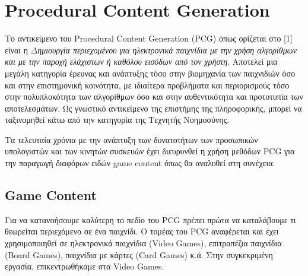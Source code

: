 \thispagestyle{empty}

\chapter{Procedural Content Generation}

Το αντικείμενο του Procedural Content Generation (PCG) όπως ορίζεται στο [1] είναι η \textit{Δημιουργία περιεχομένου για ηλεκτρονικά παιχνίδια με την χρήση αλγορίθμων και με την παροχή ελάχιστων ή καθόλου εισόδων από τον χρήστη}. Αποτελεί μια μεγάλη κατηγορία έρευνας και ανάπτυξης τόσο στην βιομηχανία των  παιχνιδιών όσο και στην επιστημονική κοινότητα, με ιδιαίτερα προβλήματα και περιορισμούς τόσο στην πολυπλοκότητα των αλγορίθμων όσο και στην αυθεντικότητα και προτοτυπία των αποτελεσμάτων.  Ως γνωστικό αντικείμενο της επιστήμης της πληροφορικής, μπορεί να ταξινομηθεί κάτω από την κατηγορία της Τεχνητής Νοημοσύνης.

\newline
Τα τελευταία χρόνια με την ανάπτυξη των δυνατοτήτων των προσωπικών υπολογιστών και των κινητών συσκευών έχει διευρυνθεί η χρήση μεθόδων PCG για την παραγωγή διαφόρων ειδών game content όπως θα αναλυθεί στη συνέχεια.

\vspace{60mm}

\section{Game Content}
Για να κατανοήσουμε καλύτερη το πεδίο του PCG πρέπει πρώτα να καταλάβουμε τι θεωρείται περιεχόμενο σε ένα παιχνίδι. Ο τομέας του PCG αναφέρεται και έχει χρησιμοποιηθεί σε ηλεκτρονικά παιχνίδια (Video Games), επιτραπέζια παιχνίδια (Board Games), παιχνίδια με κάρτες (Card Games) κ.ά. Στην συγκεκριμένη εργασία, επικεντρωθήκαμε στα Video Games.

